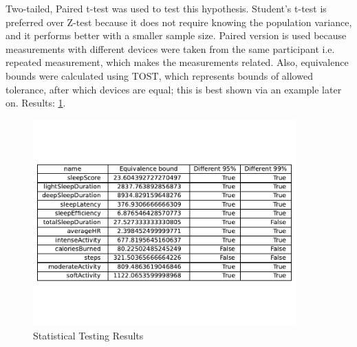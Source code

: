 Two-tailed, Paired t-test was used to test this hypothesis. Student's t-test is preferred over Z-test because it does not require knowing the population variance, and it performs better with a smaller sample size. Paired version is used because measurements with different devices were taken from the same participant i.e. repeated measurement, which makes the measurements related. Also, equivalence bounds were calculated using TOST, which represents bounds of allowed tolerance, after which devices are equal; this is best shown via an example later on. Results: \ref{fig:results}.

\begin{figure}
    
    \centering
    \includegraphics[width=0.9\textwidth,keepaspectratio]{../images/results.pdf}
    \caption{Statistical Testing Results}
    \label{fig:results}
    
\end{figure}